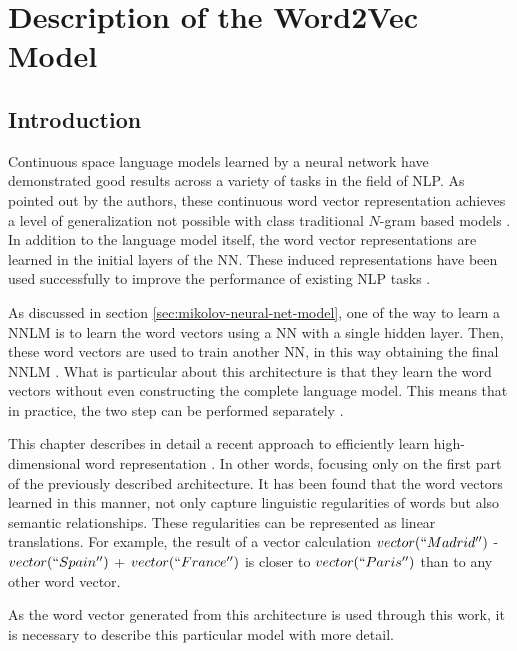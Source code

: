 \chapter{Description of the Word2Vec Model }
\label{chap:word2vec_description}


\section{Introduction}
Continuous space language  models
learned by a neural network have
demonstrated good results across a variety of tasks in the field of \ac{NLP}.  As pointed out by
the authors, these continuous word vector representation achieves a level of
generalization not possible with class traditional $N$-gram based models
\cite{conf/icassp/MikolovKBGC09}. In addition to the language model itself,
the word vector representations are learned in the initial layers of the
\ac{NN}. These 
induced representations  have been used successfully to improve the
performance of existing \ac{NLP} tasks \cite{collobert:2008}
\cite{Turian:2010:WRS:1858681.1858721}. 

As discussed in section \ref{sec:mikolov-neural-net-model},  one of the way to learn a
\ac{NNLM} is to learn the word vectors using  a \ac{NN} with a single hidden
layer. Then, these word vectors are used to  train another \ac{NN}, in this 
way obtaining   the final \ac{NNLM} \cite{conf/icassp/MikolovKBGC09}.   
What is particular about this architecture is that they learn the  word
vectors without  even constructing the complete language model.  This means
that in practice,  the two step can be performed separately \cite{conf/icassp/MikolovKBGC09}. 

This chapter describes in detail a recent approach to efficiently learn
high-dimensional word representation \cite{DBLP:journals/corr/abs-1301-3781}.
In other words, focusing only on the first part of the previously described 
architecture. It has been found that the word vectors learned in this manner,
not only capture linguistic regularities of words  but also semantic
relationships. These regularities can be represented as linear translations.
For example, the result of a vector calculation $vector(``Madrid'')$ -
$vector(``Spain'')$ + $vector(``France'')$ is closer to $vector(``Paris'')$ than to any
other word vector. \cite{DBLP:journals/corr/abs-1301-3781,MikolovSCCD13,conf/naacl/MikolovYZ13}

As the word vector generated from this architecture is used 
through this work, it is necessary to describe this particular model with more
detail.

